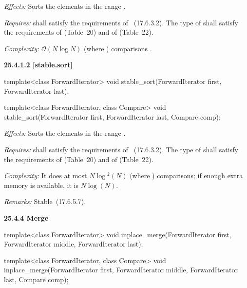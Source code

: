 \documentclass{isocpp_proposal}
\begin{document}
\begin{itemdescr}
\pnum
\emph{Effects:} Sorts the elements in the range \tcode{[first, last)}.

\pnum
\emph{Requires:}  shall satisfy the requirements of
~(17.6.3.2). The type of  shall satisfy the requirements of  (Table~20) and of  (Table~22).

\pnum
\emph{Complexity:} $\mathcal{O}(N \log{} N)$ (where ) comparisons .
\end{itemdescr}

\textbf{25.4.1.2  [stable.sort]}

\begin{itemdecl}
template<class ForwardIterator>
  void stable_sort(ForwardIterator first, ForwardIterator last);

template<class ForwardIterator, class Compare>
  void stable_sort(ForwardIterator first, ForwardIterator last,
                   Compare comp);
\end{itemdecl}

\begin{itemdescr}
\pnum
\emph{Effects:} Sorts the elements in the range \tcode{[first, last)}.

\pnum
\emph{Requires:}  shall satisfy the requirements of
~(17.6.3.2). The type of  shall satisfy the requirements of  (Table~20) and of  (Table~22).

\pnum
\emph{Complexity:} It does at most $N \log{}^2 (N)$ (where )
comparisons; if enough extra memory is available, it is $N \log{}(N)$.

\pnum
\emph{Remarks:} Stable~(17.6.5.7).
\end{itemdescr}

\textbf{25.4.4 Merge}

\begin{itemdecl}
template<class ForwardIterator>
  void inplace_merge(ForwardIterator first,
                     ForwardIterator middle,
                     ForwardIterator last);

template<class ForwardIterator, class Compare>
  void inplace_merge(ForwardIterator first,
                     ForwardIterator middle,                    
                     ForwardIterator last, Compare comp);
\end{itemdecl}
\end{document}
